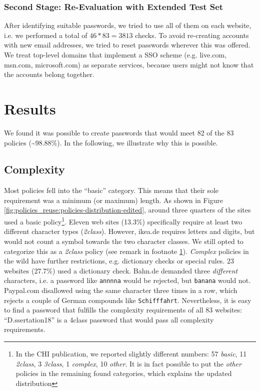 \subsubsection{Second Stage: Re-Evaluation with Extended Test Set} After identifying suitable passwords, we tried to use all of them on each website, i.e. we performed a total of $46*83=3813$ checks. To avoid re-creating accounts with new email addresses, we tried to reset passwords wherever this was offered. 
We treat top-level domains that implement a \acrlong{SSO} scheme (e.g. live.com, msn.com, microsoft.com) as separate services, because users might not know that the accounts belong together. 


\section{Results}
We found it was possible to create passwords that would meet 82 of the 83 policies (\textasciitilde98.88\%). In the following, we illustrate why this is possible. 

\subsection{Complexity}
Most policies fell into the ``basic'' category. This means that their sole requirement was a minimum (or maximum) length. As shown in Figure \ref{fig:policies_reuse:policies-distribution-edited}, around three quarters of the sites used a basic policy\footnote{\label{foot:policies_reuse:chi-publication-inconsistency}In the CHI publication, we reported slightly different numbers: 57 \textit{basic}, 11 \textit{2class}, 3 \textit{3class}, 1 \textit{complex}, 10 \textit{other}. It is in fact possible to put the \textit{other} policies in the remaining found categories, which explains the updated distribution}. 
Eleven web sites (13.3\%) specifically require at least two different character types (\textit{2class}). However, ikea.de requires letters and digits, but would not count a symbol towards the two character classes. We still opted to categorize this as a \textit{2class} policy (see remark in footnote \ref{foot:policies_reuse:chi-publication-inconsistency}). \textit{Complex} policies in the wild have further restrictions, e.g. dictionary checks or special rules. 23 websites (27.7\%) used a dictionary check. Bahn.de demanded three \textit{different} characters, i.e. a password like \texttt{annnna} would be rejected, but \texttt{banana} would not. Paypal.com disallowed using the same character three times in a row, which rejects a couple of German compounds like \texttt{Schifffahrt}. Nevertheless, it is easy to find a password that fulfills the complexity requirements of all 83 websites: ``D.ssertation18'' is a 4class password that would pass all complexity requirements. 

